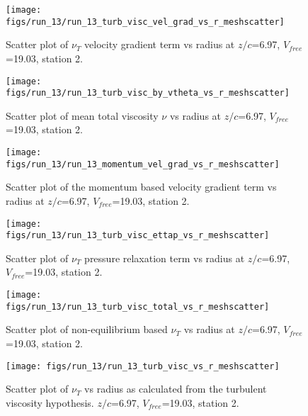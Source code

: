 \begin{figure}[H]
\centering
\texttt{[image: figs/run\_13/run\_13\_turb\_visc\_vel\_grad\_vs\_r\_meshscatter]}
\caption{Scatter plot of $\nu_T$ velocity gradient term vs radius at $z/c$=6.97, $V_{free}$=19.03, station 2.}
\end{figure}


\begin{figure}[H]
\centering
\texttt{[image: figs/run\_13/run\_13\_turb\_visc\_by\_vtheta\_vs\_r\_meshscatter]}
\caption{Scatter plot of mean total viscosity $\nu$ vs radius at $z/c$=6.97, $V_{free}$=19.03, station 2.}
\end{figure}


\begin{figure}[H]
\centering
\texttt{[image: figs/run\_13/run\_13\_momentum\_vel\_grad\_vs\_r\_meshscatter]}
\caption{Scatter plot of the momentum based velocity gradient term vs radius at $z/c$=6.97, $V_{free}$=19.03, station 2.}
\end{figure}


\begin{figure}[H]
\centering
\texttt{[image: figs/run\_13/run\_13\_turb\_visc\_ettap\_vs\_r\_meshscatter]}
\caption{Scatter plot of $\nu_T$ pressure relaxation term vs radius at $z/c$=6.97, $V_{free}$=19.03, station 2.}
\end{figure}


\begin{figure}[H]
\centering
\texttt{[image: figs/run\_13/run\_13\_turb\_visc\_total\_vs\_r\_meshscatter]}
\caption{Scatter plot of non-equilibrium based $\nu_T$ vs radius at $z/c$=6.97, $V_{free}$=19.03, station 2.}
\end{figure}


\begin{figure}[H]
\centering
\texttt{[image: figs/run\_13/run\_13\_turb\_visc\_vs\_r\_meshscatter]}
\caption{Scatter plot of $\nu_T$ vs radius as calculated from the turbulent viscosity hypothesis. $z/c$=6.97, $V_{free}$=19.03, station 2.}
\end{figure}


